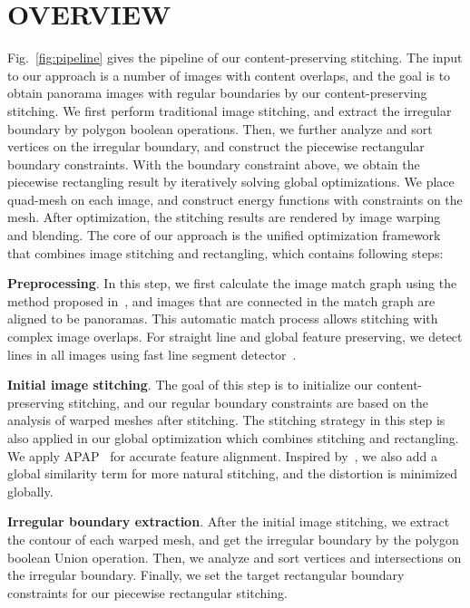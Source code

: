 \documentclass[10pt,journal,compsoc]{IEEEtran}
\begin{document}
 \section{OVERVIEW}
Fig.~\ref{fig:pipeline} gives the pipeline of our content-preserving stitching.
The input to our approach is a number of images with content overlaps, and the goal is to obtain panorama images with regular boundaries by our content-preserving stitching.
We first perform traditional image stitching, and extract the irregular boundary by polygon boolean operations.  Then, we further analyze and sort vertices on the irregular boundary, and construct the piecewise rectangular boundary constraints.
With the boundary constraint above, we obtain the piecewise rectangling result by iteratively solving global optimizations.
We place quad-mesh on each image, and construct energy functions with constraints on the mesh. After optimization, the stitching results are rendered by image warping and blending.
The core of our approach is the unified optimization framework that combines image stitching and rectangling, which contains following steps:

\textbf{Preprocessing}.
In this step, we first calculate the image match graph using the method proposed in~\cite{journals/ijcv/BrownL07}, and images that are connected in the match graph are aligned to be panoramas. This automatic match process allows stitching with complex image overlaps.
For straight line and global feature preserving, we detect lines in all images using fast line segment detector~\cite{journals/pami/GioiJMR10}.

\textbf{Initial image stitching}.
The goal of this step is to initialize our content-preserving stitching, and our regular boundary constraints are based on the analysis of warped meshes after stitching. The stitching strategy in this step is also applied in our global optimization which combines stitching and rectangling.
We apply APAP~\cite{journals/pami/ZaragozaCTBS14} for accurate feature alignment.
Inspired by~\cite{conf/eccv/ChenC16}, we also add a global similarity term for more natural stitching, and the distortion is minimized globally.

\textbf{Irregular boundary extraction}.
After the initial image stitching, we extract the contour of each warped mesh, and get the irregular boundary by the polygon boolean Union operation.
Then, we analyze and sort vertices and intersections on the irregular boundary.
Finally, we set the target rectangular boundary constraints for our piecewise rectangular stitching.
\end{document}
